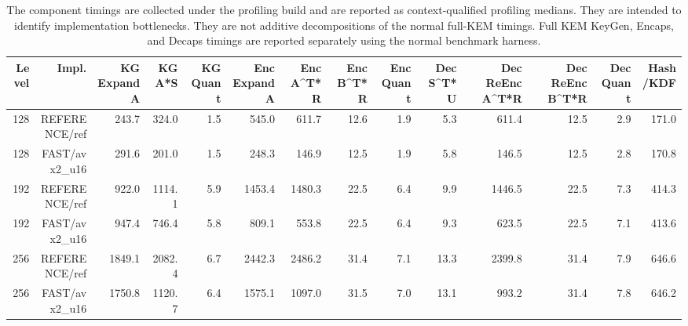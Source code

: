 \begin{table}[t]
\centering
\caption{The component timings are collected under the profiling build and are reported as context-qualified profiling medians. They are intended to identify implementation bottlenecks. They are not additive decompositions of the normal full-KEM timings. Full KEM KeyGen, Encaps, and Decaps timings are reported separately using the normal benchmark harness.}
\begin{tabular}{rrrrrrrrrrrrrr}
\toprule
Level & Impl. & KG Expand A & KG A*S & KG Quant & Enc Expand A & Enc A^T*R & Enc B^T*R & Enc Quant & Dec S^T*U & Dec ReEnc A^T*R & Dec ReEnc B^T*R & Dec Quant & Hash/KDF \\
\midrule
128 & REFERENCE/ref & 243.7 & 324.0 & 1.5 & 545.0 & 611.7 & 12.6 & 1.9 & 5.3 & 611.4 & 12.5 & 2.9 & 171.0 \\
128 & FAST/avx2_u16 & 291.6 & 201.0 & 1.5 & 248.3 & 146.9 & 12.5 & 1.9 & 5.8 & 146.5 & 12.5 & 2.8 & 170.8 \\
192 & REFERENCE/ref & 922.0 & 1114.1 & 5.9 & 1453.4 & 1480.3 & 22.5 & 6.4 & 9.9 & 1446.5 & 22.5 & 7.3 & 414.3 \\
192 & FAST/avx2_u16 & 947.4 & 746.4 & 5.8 & 809.1 & 553.8 & 22.5 & 6.4 & 9.3 & 623.5 & 22.5 & 7.1 & 413.6 \\
256 & REFERENCE/ref & 1849.1 & 2082.4 & 6.7 & 2442.3 & 2486.2 & 31.4 & 7.1 & 13.3 & 2399.8 & 31.4 & 7.9 & 646.6 \\
256 & FAST/avx2_u16 & 1750.8 & 1120.7 & 6.4 & 1575.1 & 1097.0 & 31.5 & 7.0 & 13.1 & 993.2 & 31.4 & 7.8 & 646.2 \\
\bottomrule
\end{tabular}
\end{table}

